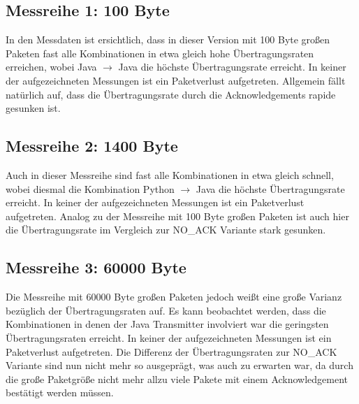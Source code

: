 \documentclass{article}
\begin{document}
    \subsection{Messreihe 1: 100 Byte}
    In den Messdaten ist ersichtlich, dass in dieser Version mit 100 Byte großen Paketen fast alle Kombinationen in etwa
    gleich hohe Übertragungsraten erreichen, wobei Java $\rightarrow$ Java die höchste Übertragungsrate erreicht.
    In keiner der aufgezeichneten Messungen ist ein Paketverlust aufgetreten.
    Allgemein fällt natürlich auf, dass die Übertragungsrate durch die Acknowledgements rapide gesunken ist.

    \subsection{Messreihe 2: 1400 Byte}
    Auch in dieser Messreihe sind fast alle Kombinationen in etwa gleich schnell, wobei diesmal die Kombination
    Python $\rightarrow$ Java die höchste Übertragungsrate erreicht.
    In keiner der aufgezeichneten Messungen ist ein Paketverlust aufgetreten.
    Analog zu der Messreihe mit 100 Byte großen Paketen ist auch hier die Übertragungsrate im Vergleich zur
    NO_ACK Variante stark gesunken.

    \subsection{Messreihe 3: 60000 Byte}
    Die Messreihe mit 60000 Byte großen Paketen jedoch weißt eine große Varianz bezüglich der Übertragungsraten auf.
    Es kann beobachtet werden, dass die Kombinationen in denen der Java Transmitter involviert war die geringsten
    Übertragungsraten erreicht.
    In keiner der aufgezeichneten Messungen ist ein Paketverlust aufgetreten.
    Die Differenz der Übertragungsraten zur NO_ACK Variante sind nun nicht mehr so ausgeprägt, was auch zu erwarten war,
    da durch die große Paketgröße nicht mehr allzu viele Pakete mit einem Acknowledgement bestätigt werden müssen.
\end{document}
